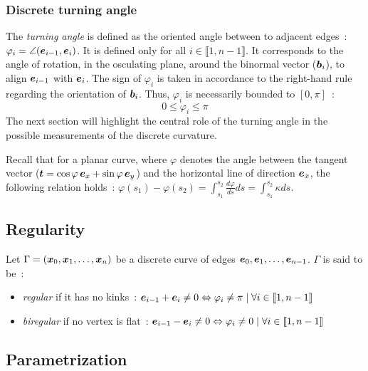\subsubsection{Discrete turning angle}
The \emph{turning angle} is defined as the oriented angle between to adjacent edges~: $\varphi_i=\angle(\boldsymbol{e}_{i-1},\boldsymbol{e}_i)$. It is defined only for all $i \in \llbracket1,n-1\rrbracket$. It corresponds to the angle of rotation, in the osculating plane, around the binormal vector ($\boldsymbol{b}_i$), to align $\boldsymbol{e}_{i-1}$ with $\boldsymbol{e}_{i}$. The sign of $\varphi_i$ is taken in accordance to the right-hand rule regarding the orientation of $\boldsymbol{b}_i$. Thus, $\varphi_i$ is necessarily bounded to $[0,\pi]$~:
\begin{equation}
	0 \leqslant \varphi_i \leqslant \pi
\end{equation}
The next section will highlight the central role of the turning angle in the possible measurements of the discrete curvature.

Recall that for a planar curve, where $\varphi$ denotes the angle between the tangent vector ($\boldsymbol{t} = \cos\varphi \,\boldsymbol{e}_x + \sin\varphi \,\boldsymbol{e}_y$) and the horizontal line of direction $\boldsymbol{e}_x$, the following relation holds~: $\varphi(s_1) - \varphi(s_2) = \int_{s_1}^{s_2} \frac{d \varphi}{d s} ds = \int_{s_1}^{s_2} \kappa ds$.

\subsection{Regularity}

Let $\Gamma = (\boldsymbol{x}_0,  \boldsymbol{x}_1, \ldots, \boldsymbol{x}_n)$ be a discrete curve of edges $\boldsymbol{e}_0,  \boldsymbol{e}_1, \ldots, \boldsymbol{e}_{n-1}$. $\Gamma$ is said to be~:
\begin{itemize}
	\item  \emph{regular} if it has no kinks~: $\boldsymbol{e}_{i-1} + \boldsymbol{e}_{i} \neq 0 \Leftrightarrow \varphi_i \neq \pi \; | \; \forall i \in \llbracket 1,n-1 \rrbracket $
	\item  \emph{biregular} if no vertex is flat~: $\boldsymbol{e}_{i-1} - \boldsymbol{e}_{i} \neq 0 \Leftrightarrow \varphi_i \neq 0 \; | \; \forall i \in \llbracket 1,n-1 \rrbracket $
\end{itemize}

\subsection{Parametrization}

